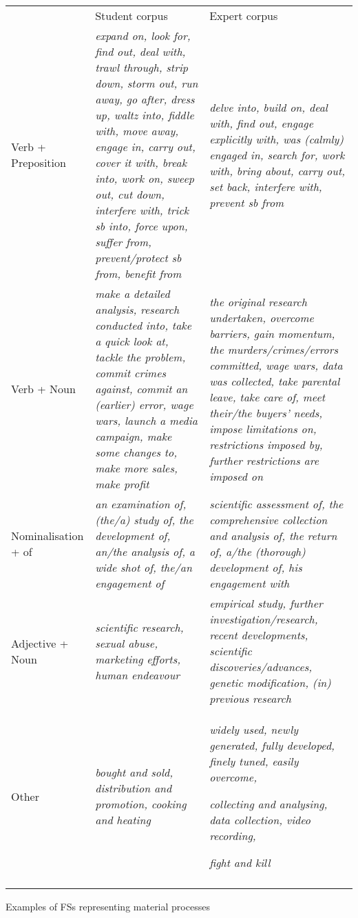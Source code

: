 \documentclass[output=paper]{langsci/langscibook}
\begin{document}
\begin{tabularx}{\textwidth}{XXX} & Student corpus & Expert corpus\\

\lsptoprule
Verb + Preposition & \textit{expand on, look for, find out, deal with, trawl through, strip down, storm out, run away, go after, dress up, waltz into, fiddle with, move away, engage in, carry out, cover it with, break into, work on, sweep out, cut down, interfere with, trick sb into, force upon, suffer from, prevent/protect sb from, benefit from} & \textit{delve into, build on, deal with, find out, engage explicitly with, was (calmly) engaged in, search for, work with, bring about, carry out, set back, interfere with, prevent sb from}\\
Verb + Noun & \textit{make a detailed analysis, research conducted into, take a quick look at, tackle the problem, commit crimes against, commit an (earlier) error, wage wars, launch a media campaign, make some changes to, make more sales, make profit} & \textit{the original research undertaken, overcome barriers, gain momentum, the murders/crimes/errors committed, wage wars, data was collected, take parental leave, take care of, meet their/the buyers’ needs, impose limitations on, restrictions imposed by, further restrictions are imposed on}\\
Nominalisation + of & \textit{an examination of, (the/a) study of, the development of, an/the analysis of, a wide shot of, the/an engagement of} & \textit{scientific assessment of, the comprehensive collection and analysis of, the return of, a/the (thorough) development of, his engagement with}\\
Adjective + Noun & \textit{scientific research, sexual abuse, marketing efforts, human endeavour} & \textit{empirical study, further investigation/research, recent developments, scientific discoveries/advances, genetic modification, (in) previous research}\\
Other & \textit{bought and sold, distribution and promotion, cooking and heating} & \textit{widely used, newly generated, fully developed, finely tuned, easily overcome,}

\textit{collecting and analysing, data collection, video recording,} 

\textit{fight and kill}\\
\lspbottomrule
\end{tabularx}
\begin{table}
\caption{Examples of FSs representing material processes}
\label{tab:key:5}
\end{table}
\end{document}
